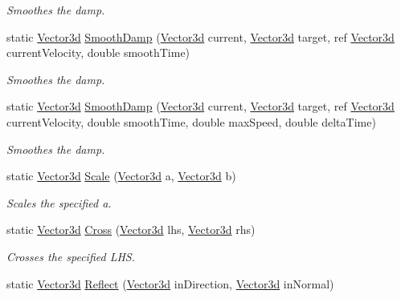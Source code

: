 \begin{DoxyCompactItemize}
\begin{DoxyCompactList}\small\item\em Smoothes the damp. \end{DoxyCompactList}\item 
static \hyperlink{struct_unity_engine_1_1_vector3d}{Vector3d} \hyperlink{struct_unity_engine_1_1_vector3d_a6113aa76098dd0da6220b80b4a6464c3}{Smooth\+Damp} (\hyperlink{struct_unity_engine_1_1_vector3d}{Vector3d} current, \hyperlink{struct_unity_engine_1_1_vector3d}{Vector3d} target, ref \hyperlink{struct_unity_engine_1_1_vector3d}{Vector3d} current\+Velocity, double smooth\+Time)
\begin{DoxyCompactList}\small\item\em Smoothes the damp. \end{DoxyCompactList}\item 
static \hyperlink{struct_unity_engine_1_1_vector3d}{Vector3d} \hyperlink{struct_unity_engine_1_1_vector3d_a1ded5a47fb1d44849038b5268528d4e2}{Smooth\+Damp} (\hyperlink{struct_unity_engine_1_1_vector3d}{Vector3d} current, \hyperlink{struct_unity_engine_1_1_vector3d}{Vector3d} target, ref \hyperlink{struct_unity_engine_1_1_vector3d}{Vector3d} current\+Velocity, double smooth\+Time, double max\+Speed, double delta\+Time)
\begin{DoxyCompactList}\small\item\em Smoothes the damp. \end{DoxyCompactList}\item 
static \hyperlink{struct_unity_engine_1_1_vector3d}{Vector3d} \hyperlink{struct_unity_engine_1_1_vector3d_ad926a6c3cd992e7a5a32a40eea40aebd}{Scale} (\hyperlink{struct_unity_engine_1_1_vector3d}{Vector3d} a, \hyperlink{struct_unity_engine_1_1_vector3d}{Vector3d} b)
\begin{DoxyCompactList}\small\item\em Scales the specified a. \end{DoxyCompactList}\item 
static \hyperlink{struct_unity_engine_1_1_vector3d}{Vector3d} \hyperlink{struct_unity_engine_1_1_vector3d_ad5a28b0a65ef2e9114f62e397f28f608}{Cross} (\hyperlink{struct_unity_engine_1_1_vector3d}{Vector3d} lhs, \hyperlink{struct_unity_engine_1_1_vector3d}{Vector3d} rhs)
\begin{DoxyCompactList}\small\item\em Crosses the specified L\+HS. \end{DoxyCompactList}\item 
static \hyperlink{struct_unity_engine_1_1_vector3d}{Vector3d} \hyperlink{struct_unity_engine_1_1_vector3d_ab71006fd2f778bade341ba37d3f4e807}{Reflect} (\hyperlink{struct_unity_engine_1_1_vector3d}{Vector3d} in\+Direction, \hyperlink{struct_unity_engine_1_1_vector3d}{Vector3d} in\+Normal)

\end{DoxyCompactItemize}
